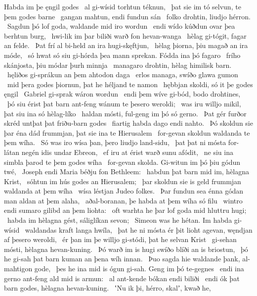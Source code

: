 Habda im þe ęngil godes \hld\ al gi-wísid
torhtun téknun, \hld\ þat sie im tó selvun,
te þem godes barne \hld\ gangan mahtun,
endi fundun sán \hld\ folko drohtin,
liudjo hérron. \hld\ Sagdun þó lof goda,
waldande mid iro wordun \hld\ endi wído kúðdun
ovar þea berhtun burg, \hld\ hwi-lik im þar biliði warð
fon hevan-wanga \hld\ hèlag gi-tógit,
fagar an felde. \hld\ Þat frí al bi-held
an ira hugi-skęftjun, \hld\ hèlag þiorna,
þiu magað an ira móde, \hld\ só hwat só siu gi-hórda þea mann sprekan.
Fódda ina þó fagaro \hld\ frího skánjosta,
þiu módar þurh minnja \hld\ managaro drohtin,
hèlag himilisk barn. \hld\ hęliðos gi-sprákun
an þem ahtodon daga \hld\ erlos managa,
swíðo glawa gumon \hld\ mid þera godes þiornun,
þat he héljand te namon \hld\ hębbjan skoldi,
só it þe godes ęngil \hld\ Gabriel gi-sprak
wáron wordun \hld\ endi þem wíve gi-bód,
bodo drohtines, \hld\ þó siu érist þat barn ant-feng
wánum te þesero weroldi; \hld\ was iru willjo mikil,
þat siu ina só hèlag-líko \hld\ haldan mósti,
ful-geng im þó só gerno. \hld\ Þat gér furðor skréd
untþat þat friðu-barn godes \hld\ fiartig habda
dago endi nahto. \hld\ Þó skoldun sie þar éna dád frummjan,
þat sie ina te Hierusalem \hld\ for-gevan skoldun
waldanda te þem wíha. \hld\ Só was iro wísa þan,
þero liudjo land-sidu, \hld\ þat þat ni mósta for-látan negén
idis undar Ebreon, \hld\ ef iru at érist warð
sunu afódit, \hld\ ne siu ina simbla þarod
te þem godes wíha \hld\ for-gevan skolda.
Gi-witun im þó þiu gódun twé, \hld\ Joseph endi Maria
béðju fon Bethleem: \hld\ habdun þat barn mid im,
hèlagna Krist, \hld\ sóhtun im hús godes
an Hierusalem; \hld\ þar skoldun sie is geld frummjan
waldanda at þem wíha \hld\ wísa léstjan
Judeo folkes. \hld\ Þar fundun sea énna gódan man
aldan at þem alaha, \hld\ aðal-boranan,
þe habda at þem wíha só filu \hld\ wintro endi sumaro
gilibd an þem liohta: \hld\ oft warhta he þar lof goda
mid hluttru hugi; \hld\ habda im hèlagna gést,
sáliglíkan sevon; \hld\ Simeon was he hétan.
Im habda gi-wísid \hld\ waldandas kraft
langa hwíla, \hld\ þat he ni mósta ér þit lioht agevan,
węndjan af þesero weroldi, \hld\ ér þan im þe willjo gi-stódi,
þat he selvan Krist \hld\ gi-sehan mósti,
hèlagna hevan-kuning. \hld\ Þó warð im is hugi swíðo
blíði an is briostun, \hld\ þó he gi-sah þat barn kuman
an þena wíh innan. \hld\ Þuo sagda hie waldande þank,
al-mahtigon gode, \hld\ þes he ina mid is ógun gi-sah.
Geng im þó te-gegnes \hld\ endi ina gerno ant-feng
ald mid is armun: \hld\ al ant-kende
bókan endi biliði \hld\ endi ók þat barn godes,
hèlagna hevan-kuning. \hld\ ʽNu ik þi, hérro, skalʼ, kwað he,

